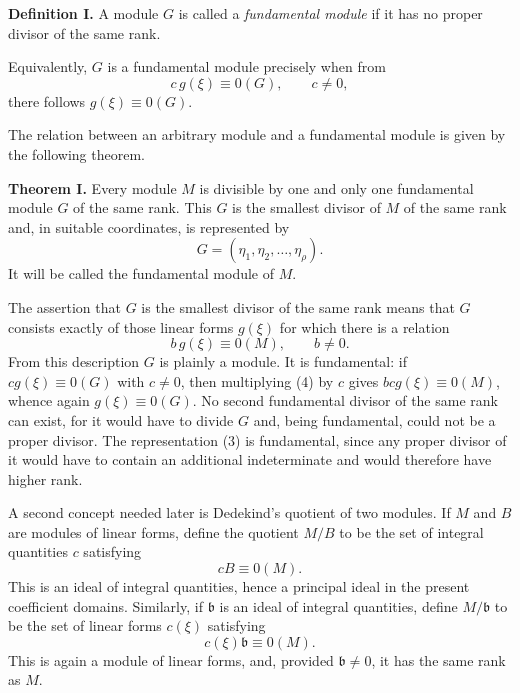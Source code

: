 \documentclass[12pt]{article}
\begin{document}
\textbf{Definition I.} A module $G$ is called a \emph{fundamental module} if it has no proper divisor of the same rank.

Equivalently, $G$ is a fundamental module precisely when from
\begin{equation}
  c\,g(\xi)\equiv 0(G),\qquad c\ne 0,                              \tag{2}
\end{equation}
there follows $g(\xi)\equiv 0(G)$.

The relation between an arbitrary module and a fundamental module is given by the following theorem.

\textbf{Theorem I.} Every module $M$ is divisible by one and only one fundamental module $G$ of the same rank. This $G$ is the smallest divisor of $M$ of the same rank and, in suitable coordinates, is represented by
\begin{equation}
  G=(\eta_1,\eta_2,\ldots,\eta_\rho).                              \tag{3}
\end{equation}
It will be called the fundamental module of $M$.

The assertion that $G$ is the smallest divisor of the same rank means that $G$ consists exactly of those linear forms $g(\xi)$ for which there is a relation
\begin{equation}
  b\,g(\xi)
  \equiv 0(M),\qquad b\ne 0.                                      \tag{4}
\end{equation}
From this description $G$ is plainly a module. It is fundamental: if $c g(\xi)\equiv0(G)$ with $c\ne0$, then multiplying (4) by $c$ gives $bcg(\xi)\equiv0(M)$, whence again $g(\xi)\equiv0(G)$. No second fundamental divisor of the same rank can exist, for it would have to divide $G$ and, being fundamental, could not be a proper divisor. The representation (3) is fundamental, since any proper divisor of it would have to contain an additional indeterminate and would therefore have higher rank.

A second concept needed later is Dedekind's quotient of two modules. If $M$ and $B$ are modules of linear forms, define the quotient $M/B$ to be the set of integral quantities $c$ satisfying
\[
  cB\equiv0(M).
\]
This is an ideal of integral quantities, hence a principal ideal in the present coefficient domains. Similarly, if $\mathfrak b$ is an ideal of integral quantities, define $M/\mathfrak b$ to be the set of linear forms $c(\xi)$ satisfying
\[
  c(\xi)\mathfrak b\equiv0(M).
\]
This is again a module of linear forms, and, provided $\mathfrak b\ne0$, it has the same rank as $M$.
\end{document}
